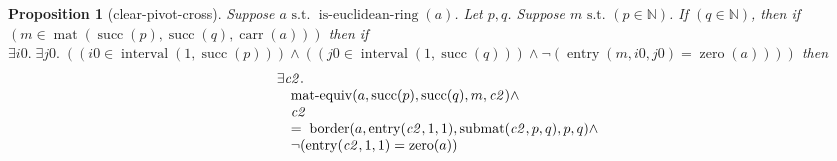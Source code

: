 \documentclass[11pt]{article}
\theoremstyle{plain}
\newtheorem{proposition}{Proposition}
\begin{document}
\begin{proposition}[clear-pivot-cross]
Suppose $a \text{ s.t. } \operatorname{is\text{-}euclidean\text{-}ring}(a)$. Let $p, q$. Suppose $m \text{ s.t. } (p \in \mathbb{N})$. If $(q \in \mathbb{N})$, then if $(m \in \operatorname{mat}(\operatorname{succ}(p), \operatorname{succ}(q), \operatorname{carr}(a)))$ then if $\exists \mathit{i0}.\; \exists \mathit{j0}.\; ((\mathit{i0} \in \operatorname{interval}(1, \operatorname{succ}(p))) \wedge ((\mathit{j0} \in \operatorname{interval}(1, \operatorname{succ}(q))) \wedge \neg (\operatorname{entry}(m, \mathit{i0}, \mathit{j0}) = \operatorname{zero}(a))))$ then 
\begin{equation*}
\begin{array}{@{}l@{}} \exists \mathit{c2}. \\ \quad \operatorname{mat\text{-}equiv}(a, \operatorname{succ}(p), \operatorname{succ}(q), m, \mathit{c2}) \wedge \\ \quad \mathit{c2} \\ \quad =\; \operatorname{border}(a, \operatorname{entry}(\mathit{c2}, 1, 1), \operatorname{submat}(\mathit{c2}, p, q), p, q) \wedge \\ \quad \neg (\operatorname{entry}(\mathit{c2}, 1, 1) = \operatorname{zero}(a)) \end{array}
\end{equation*}

\end{proposition}
\end{document}

